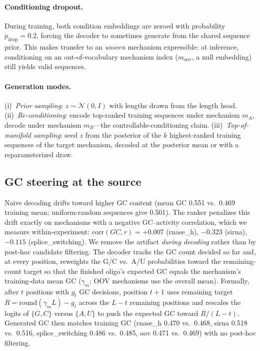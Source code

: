 \documentclass{article} %
\begin{document}
\paragraph{Conditioning dropout.}
During training, both condition embeddings are zeroed with probability $p_{\mathrm{drop}} = 0.2$, forcing the decoder to sometimes generate from the shared sequence prior. This makes transfer to an \emph{unseen} mechanism expressible: at inference, conditioning on an out-of-vocabulary mechanism index ($m_{\mathrm{oov}}$, a null embedding) still yields valid sequences.

\paragraph{Generation modes.}
(i)~\emph{Prior sampling}: $z \sim \mathcal{N}(0, I)$ with lengths drawn from the length head. (ii)~\emph{Re-conditioning}: encode top-ranked training sequences under mechanism $m_A$, decode under mechanism $m_B$---the controllable-conditioning claim. (iii)~\emph{Top-of-manifold sampling}: seed $z$ from the posterior of the $k$ highest-ranked training sequences of the target mechanism, decoded at the posterior mean or with a reparameterized draw.

\subsection{GC steering at the source}

Naive decoding drifts toward higher GC content (mean GC 0.551 vs.\ 0.469 training mean; uniform-random sequences give 0.501). The ranker penalizes this drift exactly on mechanisms with a negative GC--activity correlation, which we measure within-experiment: $\mathrm{corr}(GC, r) = +0.007$ (rnase\_h), $-0.323$ (sirna), $-0.115$ (splice\_switching). We remove the artifact \emph{during decoding} rather than by post-hoc candidate filtering. The decoder tracks the GC count decided so far and, at every position, reweights the G/C vs.\ A/U probabilities toward the remaining-count target so that the finished oligo's expected GC equals the mechanism's training-data mean GC ($\gamma_m$; OOV mechanisms use the overall mean). Formally, after $t$ positions with $g_t$ GC decisions, position $t+1$ uses remaining target $R = \mathrm{round}(\gamma_m L) - g_t$ across the $L-t$ remaining positions and rescales the logits of $\{G,C\}$ versus $\{A,U\}$ to push the expected GC toward $R/(L-t)$. Generated GC then matches training GC (rnase\_h 0.470 vs.\ 0.468, sirna 0.518 vs.\ 0.516, splice\_switching 0.486 vs.\ 0.485, oov 0.471 vs.\ 0.469) with no post-hoc filtering.
\end{document}
